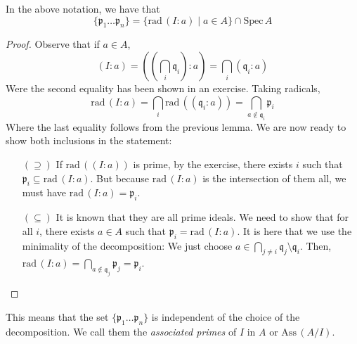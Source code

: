 \begin{theorem}
    In the above notation, we have that
    \[\{\mathfrak{p}_1 \ldots \mathfrak{p}_n\} =
    \{\text{rad}\,(I : a) \mid a \in A\} \cap \text{Spec}\,A\]

    \begin{proof}
        Observe that if $a \in A$,
        \[(I:a) =
        \left( \left(\bigcap_i \mathfrak{q}_i\right) : a \right )
        = \bigcap_i (\mathfrak{q}_i : a)
        \]
        Were the second equality has been shown in an exercise.
        Taking radicals,
        \[
            \text{rad}\,(I:a) = \bigcap_i \text{rad}\,((\mathfrak{q}_i : a))
            = \bigcap_{a \notin \mathfrak{q}_i} \mathfrak{p}_i
        \]
        Where the last equality follows from the previous lemma.
        We are now ready to show both inclusions in the statement:

        \begin{itemize}
            \item[$(\supseteq)$]
            If $\text{rad}\,((I : a))$ is prime,
            by the exercise, there exists $i$ such that
            $\mathfrak{p}_i \subseteq \text{rad}\,(I : a)$.
            But because $\text{rad}\,(I : a)$ is the intersection of them all,
            we must have $\text{rad}\,(I : a) = \mathfrak{p}_i$.

            \item[$(\subseteq)$]
            It is known that they are all prime ideals.
            We need to show that for all $i$, there exists $a \in A$ such that
            $\mathfrak{p}_i = \text{rad}\,(I : a)$.
            It is here that we use the minimality of the decomposition:
            We just choose $a \in \bigcap_{j \neq i} \mathfrak{q}_j \setminus \mathfrak{q}_i $.
            Then, $\text{rad}\,(I : a) = \bigcap_{a \notin \mathfrak{q}_j} \mathfrak{p}_j = \mathfrak{p}_i$.


        \end{itemize}

    \end{proof}
\end{theorem}

\begin{rk}
    This means that the set $\{\mathfrak{p}_1 \ldots \mathfrak{p}_n\}$
    is independent of the choice of the decomposition.
    We call them the \emph{associated primes} of $I$ in $A$
    or $\text{Ass}\,(A/I)$.

\end{rk}